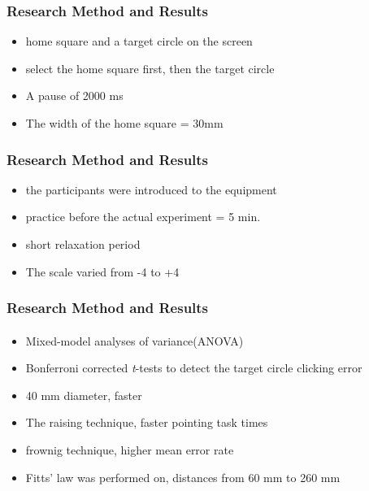 \documentclass{beamer}
\begin{document}

\begin{frame}
\frametitle{Research Method and Results }

\begin{itemize}
\item home square and a target circle on the screen
\item select the home square first, then the target circle
\item A pause of 2000 ms
\item The width of the home square = 30mm

\end{itemize}

\end{frame}


\begin{frame}
\frametitle{Research Method and Results }
\begin{itemize}
\item the participants were introduced to the equipment
\item practice before the actual experiment = 5 min.
\item short relaxation period 
\item The scale varied from -4 to +4

\end{itemize}


\end{frame}



\begin{frame}
\frametitle{Research Method and Results }
\framesubtitle{}
\begin{itemize}
\item Mixed-model analyses of variance(ANOVA)
\item Bonferroni corrected {\it t}-tests to detect the target circle clicking error 
\item 40 mm diameter, faster
\item The raising technique, faster pointing task times
\item frownig technique, higher mean error rate
\item  Fitts' law was performed on, distances from 60 mm to 260 mm 
\end{itemize}
\end{frame}
\end{document}
